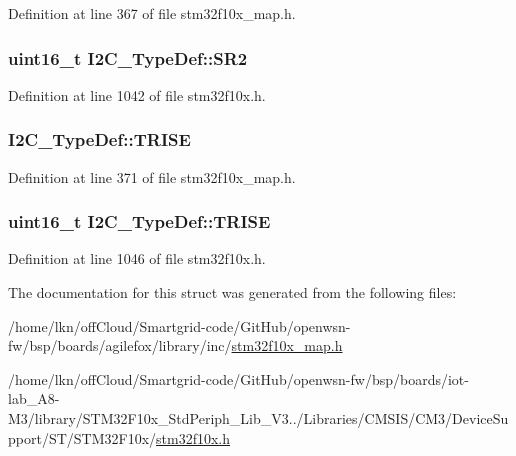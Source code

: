 Definition at line 367 of file stm32f10x\+\_\+map.\+h.

\subsubsection[{\texorpdfstring{S\+R2}{SR2}}]{ {\bf uint16\+\_\+t} I2\+C\+\_\+\+Type\+Def\+::\+S\+R2}\hypertarget{struct_i2_c___type_def_a95c7f729b10eb2acafe499d9c9a81a83}{}\label{struct_i2_c___type_def_a95c7f729b10eb2acafe499d9c9a81a83}


Definition at line 1042 of file stm32f10x.\+h.

\subsubsection[{\texorpdfstring{T\+R\+I\+SE}{TRISE}}]{ I2\+C\+\_\+\+Type\+Def\+::\+T\+R\+I\+SE}\hypertarget{struct_i2_c___type_def_a0a233d1d86b1eb30de1708f9f28b8319}{}\label{struct_i2_c___type_def_a0a233d1d86b1eb30de1708f9f28b8319}


Definition at line 371 of file stm32f10x\+\_\+map.\+h.

\subsubsection[{\texorpdfstring{T\+R\+I\+SE}{TRISE}}]{ {\bf uint16\+\_\+t} I2\+C\+\_\+\+Type\+Def\+::\+T\+R\+I\+SE}\hypertarget{struct_i2_c___type_def_aaba7a808e4dfae5cc06b197c298af206}{}\label{struct_i2_c___type_def_aaba7a808e4dfae5cc06b197c298af206}


Definition at line 1046 of file stm32f10x.\+h.



The documentation for this struct was generated from the following files\+:\begin{DoxyCompactItemize}
\item 
/home/lkn/off\+Cloud/\+Smartgrid-\/code/\+Git\+Hub/openwsn-\/fw/bsp/boards/agilefox/library/inc/\hyperlink{agilefox_2library_2inc_2stm32f10x__map_8h}{stm32f10x\+\_\+map.\+h}\item 
/home/lkn/off\+Cloud/\+Smartgrid-\/code/\+Git\+Hub/openwsn-\/fw/bsp/boards/iot-\/lab\+\_\+\+A8-\/\+M3/library/\+S\+T\+M32\+F10x\+\_\+\+Std\+Periph\+\_\+\+Lib\+\_\+\+V3../\+Libraries/\+C\+M\+S\+I\+S/\+C\+M3/\+Device\+Support/\+S\+T/\+S\+T\+M32\+F10x/\hyperlink{iot-lab___a8-_m3_2library_2_s_t_m32_f10x___std_periph___lib___v3_85_80_2_libraries_2_c_m_s_i_s_26497265545392eb5694b064ae15018db}{stm32f10x.\+h}\end{DoxyCompactItemize}
